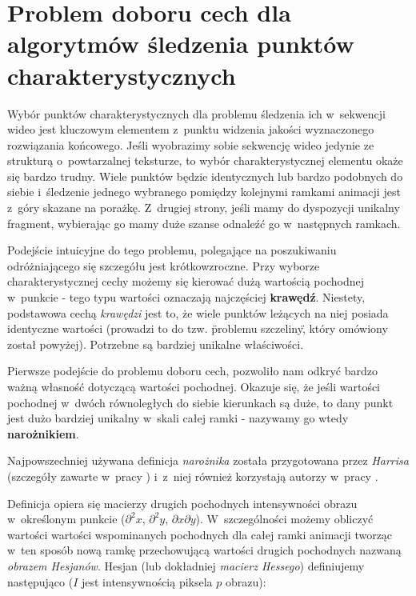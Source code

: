   \section{Problem doboru cech dla algorytmów śledzenia punktów charakterystycznych}\label{Section_GoodGeaturesToTrack}
    Wybór punktów charakterystycznych dla problemu śledzenia ich w~sekwencji wideo jest kluczowym elementem z~punktu widzenia jakości wyznaczonego rozwiązania końcowego. Jeśli wyobrazimy sobie sekwencję wideo jedynie ze strukturą o~powtarzalnej teksturze, to wybór charakterystycznej elementu okaże się bardzo trudny. Wiele punktów będzie identycznych lub bardzo podobnych do siebie i~śledzenie jednego wybranego pomiędzy kolejnymi ramkami animacji jest z~góry skazane na porażkę. Z~drugiej strony, jeśli mamy do dyspozycji unikalny fragment, wybierając go mamy duże szanse odnaleźć go w~następnych ramkach.

    Podejście intuicyjne do tego problemu, polegające na poszukiwaniu odróżniającego się szczegółu jest krótkowzroczne. Przy wyborze charakterystycznej cechy możemy się kierować dużą wartością pochodnej w~punkcie - tego typu wartości oznaczają najczęściej \textbf{krawędź}. Niestety, podstawowa cechą \textit{krawędzi} jest to, że wiele punktów leżących na niej posiada identyczne wartości (prowadzi to do tzw. \"problemu szczeliny\", który omówiony został powyżej). Potrzebne są bardziej unikalne właściwości.

    Pierwsze podejście do problemu doboru cech, pozwoliło nam odkryć bardzo ważną własność dotyczącą wartości pochodnej. Okazuje się, że jeśli wartości pochodnej w~dwóch równoległych do siebie kierunkach są duże, to dany punkt jest dużo bardziej unikalny w~skali całej ramki - nazywamy go wtedy \textbf{narożnikiem}.

    Najpowszechniej używana definicja \textit{narożnika} została przygotowana przez \textit{Harrisa} (szczegóły zawarte w~pracy \cite{Harris88}) i~z~niej również korzystają autorzy w~pracy \cite{GoodFeaturesToTrack94}.

    Definicja opiera się macierzy drugich pochodnych intensywności obrazu w~określonym punkcie ($\partial^2 x$, $\partial^2 y$, $\partial x\partial y$). W~szczególności możemy obliczyć wartości wartości wspominanych pochodnych dla całej ramki animacji tworząc w~ten sposób nową ramkę przechowującą wartości drugich pochodnych nazwaną \textit{obrazem Hesjanów}. Hesjan (lub dokładniej \textit{macierz Hessego}) definiujemy następująco ($I$ jest intensywnością piksela $p$ obrazu):

